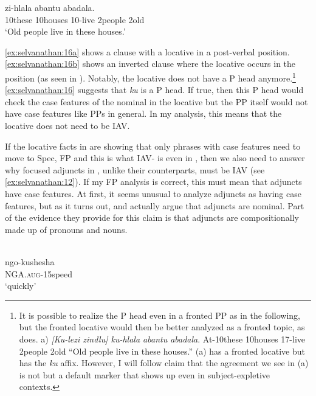 \documentclass[output=paper
,newtxmath
,modfonts
,nonflat]{langsci/langscibook}
\begin{document}
\ex\label{ex:selvanathan:16b}
	  zi-hlala  abantu  abadala. \\
	10these   10houses   10-live   2people   2old\\
	\glt `Old people live in these houses.' 
\z
\z

\ref{ex:selvanathan:16a} shows a clause with a locative in a post-verbal position. \ref{ex:selvanathan:16b} shows an inverted clause where the locative occurs in the  position (as seen in ). Notably, the locative does not have a P head anymore.\footnote{It is possible to realize the P head even in a fronted PP as in the following, but the fronted locative would then be better analyzed as a fronted topic, as \citet{Buell2007} does. a)   \citep[108]{Buell2007}  \textit{[Ku-lezi  zindlu]    ku-hlala  abantu   abadala}.   At-10these   10houses   17-live     2people  2old  “Old people live in these houses.” (a) has a fronted locative but has the \textit{ku} affix. However, I will follow  claim that the agreement we see in (a) is not  but a default marker that shows up even in subject-expletive contexts.} \ref{ex:selvanathan:16} suggests that \textit{ku} is a P head. If true, then this P head would check the case features of the nominal in the locative but the PP itself would not have case features like PPs in general. In my analysis, this means that the locative does not need to be IAV. 

If the locative facts in  are showing that only phrases with case features need to move to Spec, FP and this is what IAV- is even in , then we also need to answer why focused adjuncts in , unlike their  counterparts, must be IAV (see \ref{ex:selvanathan:12}). If my FP analysis is correct, this must mean that  adjuncts have case features. At first, it seems unusual to analyze adjuncts as having case features, but as it turns out, \citet{Halpert2012} and \citet{chengdowning2014} actually argue that  adjuncts are nominal. Part of the evidence they provide for this claim is that  adjuncts are compositionally made up of pronouns and nouns. 

\ea\label{ex:selvanathan:17}
\\
\ea\label{ex:selvanathan:17a}
\gll ngo-kushesha\\
NGA.\textsc{aug}{}-15speed\\
\glt `quickly'
\end{document}
